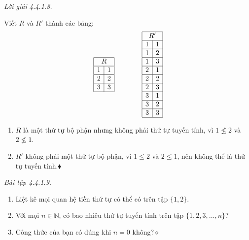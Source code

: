 \noindent\textit{Lời giải 4.4.1.8.}\keepwithnext

Viết $R$ và $R'$ thành các bảng:
\[
\begin{array}{|r|r|}\hline\multicolumn{2}{|c|}{R}\\\hline1&1\\\hline2&2\\\hline3&3\\\hline\end{array}
\qquad\qquad
\begin{array}{|r|r|}\hline\multicolumn{2}{|c|}{R'}\\\hline
1&1\\\hline1&2\\\hline1&3\\\hline2&1\\\hline2&2\\\hline2&3\\\hline3&1\\\hline3&2\\\hline3&3\\\hline
\end{array}
\]
\begin{enumerate}[label=\alph*.]
\item $R$ là một thứ tự bộ phận nhưng không phải thứ tự tuyến tính, vì $1\nleq2$ và $2\nleq1$.
\item $R'$ không phải một thứ tự bộ phận, vì $1\le2$ và $2\le1$, nên không thể là thứ tự tuyến tính.\nobreak\hfill$\blacklozenge$
\end{enumerate}

\noindent\textit{Bài tập 4.4.1.9.}\keepwithnext
\begin{enumerate}[label=\alph*.]
\item Liệt kê mọi quan hệ tiền thứ tự có thể có trên tập $\{1,2\}$.
\item Với mọi $n\in\mathbb{N}$, có bao nhiêu thứ tự tuyến tính trên tập $\{1,2,3,\ldots,n\}$?
\item Công thức của bạn có đúng khi $n=0$ không?\nobreak\hfill$\diamond$
\end{enumerate}


